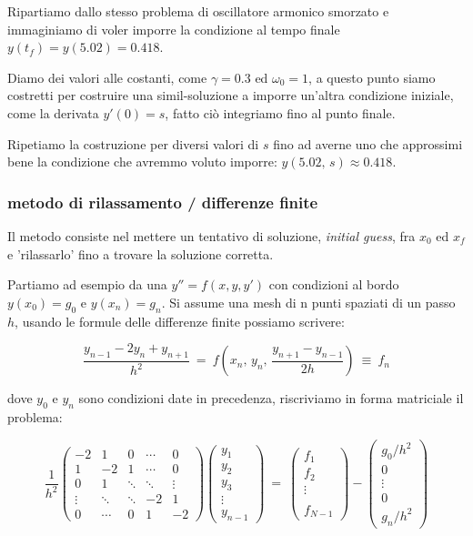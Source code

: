 Ripartiamo dallo stesso problema di oscillatore armonico smorzato e immaginiamo di voler imporre la condizione al tempo finale $y(t_f)=y(5.02)=0.418$.

Diamo dei valori alle costanti, come $\gamma=0.3$ ed $\omega_0=1$, a questo punto siamo costretti per costruire una simil-soluzione a imporre un'altra condizione iniziale, come la derivata $y'(0)=s$, fatto ciò integriamo fino al punto finale.

Ripetiamo la costruzione per diversi valori di $s$ fino ad averne uno che approssimi bene la condizione che avremmo voluto imporre: $y(5.02,\, s)\approx0.418$.

\subsubsection{metodo di rilassamento / differenze finite}

Il metodo consiste nel mettere un tentativo di soluzione, \emph{initial guess}, fra $x_0$ ed $x_f$ e 'rilassarlo' fino a trovare la soluzione corretta.

Partiamo ad esempio da una $y''=f(x, y, y')$ con condizioni al bordo $y(x_0)=g_0$ e $y(x_n)=g_n$. Si assume una mesh di n punti spaziati di un passo $h$, usando le formule delle differenze finite possiamo scrivere:

\[
\frac{y_{n-1}-2y_n + y_{n+1}}{h^2}\ =\ f(x_n,\, y_n,\, \frac{y_{n+1}-y_{n-1}}{2h})\  \equiv\ f_n
\]

dove $y_0$ e $y_n$ sono condizioni date in precedenza, riscriviamo in forma matriciale il problema:

\[ \frac{1}{h^2}
\begin{pmatrix}
	-2 & 1 & 0 & \cdots & 0 \\
	1 & -2 & 1 & \cdots & 0 \\
	0 & 1 & \ddots & \ddots & \vdots \\
	\vdots & \ddots & \ddots & -2 & 1 \\
	0 & \cdots & 0 & 1 & -2
\end{pmatrix}
\begin{pmatrix}
	y_1 \\ y_2 \\ y_3 \\ \vdots \\ y_{n-1}
\end{pmatrix}
\ =\ \begin{pmatrix}
	f_1 \\ f_2 \\ \vdots \\ \\ f_{N-1}
\end{pmatrix} - \begin{pmatrix}
	g_0/h^2 \\ 0 \\ \vdots \\ 0\\ g_{n}/h^2
\end{pmatrix}
\]

